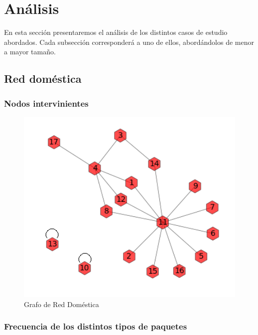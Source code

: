 

\section{An\'alisis}

En esta secci\'on presentaremos el an\'alisis de los distintos casos de estudio abordados. Cada subsecci\'on corresponder\'a a uno de ellos, abord\'andolos de menor a mayor tamaño.

\subsection{Red dom\'estica}

\subsubsection{Nodos intervinientes}


\begin{figure}[h!]
    \centering                                                       
    \includegraphics[width=400pt]{img/domesticaGraph.png}
    \caption{Grafo de Red Doméstica}
    \label{domesticaGraph}
\end{figure}


\subsubsection{Frecuencia de los distintos tipos de paquetes}

